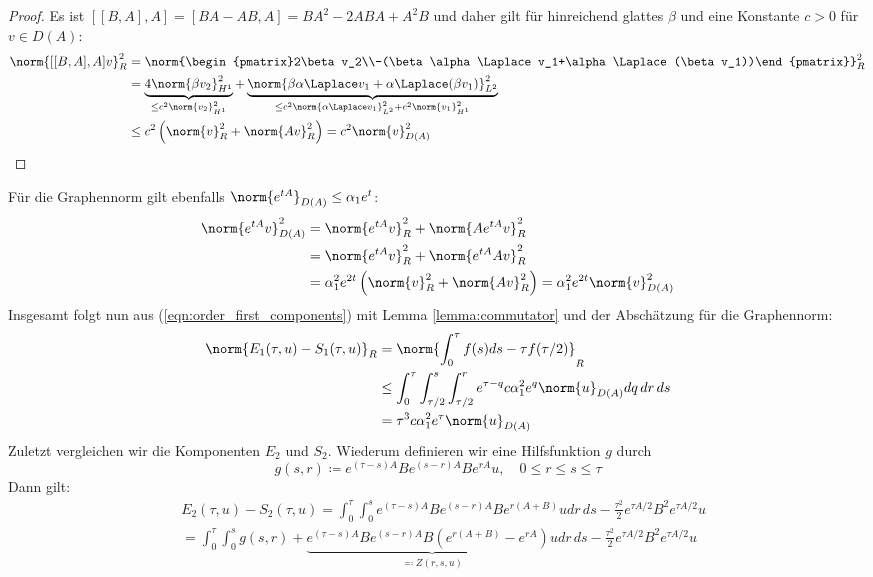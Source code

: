 \begin{proof}
Es ist $[[B,A],A]=[BA-AB,A]=BA^2-2ABA+A^2B$ und daher gilt für hinreichend glattes $\beta$ und eine Konstante $c>0$ für $v\in D(A)$:
\begin{align*}
\norm{[[B,A],A]v}_R^2&=\norm{\begin{pmatrix}2\beta v_2\\-(\beta\alpha\Laplace v_1+\alpha\Laplace(\beta v_1))\end{pmatrix}}_R^2\\
&=\underbrace{4\norm{\beta v_2}_{H^1}^2}_{\le c^2\norm{v_2}_{H^1}^2}+\underbrace{\norm{\beta\alpha\Laplace v_1 + \alpha\Laplace(\beta v_1)}_{L^2}^2}_{\le c^2\norm{\alpha \Laplace v_1}_{L^2}^2+c^2\norm{v_1}_{H^1}^2}\\
&\le c^2 \left(\norm{v}_R^2+\norm{Av}_R^2\right)=c^2\norm{v}_{D(A)}^2
\end{align*}
\end{proof}
Für die Graphennorm gilt ebenfalls $\norm{e^{tA}}_{D(A)}\le \alpha_1e^t$:
\begin{align*}
\norm{e^{tA}v}_{D(A)}^2&=\norm{e^{tA}v}_R^2+\norm{Ae^{tA}v}_R^2\\
&=\norm{e^{tA}v}_R^2+\norm{e^{tA}Av}_R^2\\
&=\alpha_1^2e^{2t}\left(\norm{v}_R^2+\norm{Av}_R^2\right)=\alpha_1^2e^{2t}\norm{v}_{D(A)}^2
\end{align*}
Insgesamt folgt nun aus (\ref{eqn:order_first_components}) mit Lemma \ref{lemma:commutator} und der Abschätzung für die Graphennorm:
\begin{align*}
\norm{E_1(\tau,u)-S_1(\tau,u)}_R&=\norm{\int_0^\tau f(s)ds-\tau f(\tau/2)}_R\\
&\le \int_0^\tau\int_{\tau/2}^s\int_{\tau/2}^r e^{\tau - q}c\alpha_1^2e^q\norm{u}_{D(A)}dq\,dr\,ds\\
&=\tau^3c\alpha_1^2e^\tau\norm{u}_{D(A)}
\end{align*}
Zuletzt vergleichen wir die Komponenten $E_2$ und $S_2$. Wiederum definieren wir eine Hilfsfunktion $g$ durch
\[g(s,r)\coloneqq e^{(\tau-s)A}Be^{(s-r)A}Be^{rA}u,\quad 0\le r\le s\le \tau\]
Dann gilt:
\begin{align*}
&E_2(\tau,u)-S_2(\tau,u)=\int_0^\tau\int_0^se^{(\tau-s)A}Be^{(s-r)A}Be^{r(A+B)}udr\,ds-\frac{\tau^2}{2}e^{\tau A/2}B^2e^{\tau A/2}u\\
&=\int_0^\tau\int_0^s g(s,r) + \underbrace{e^{(\tau-s)A}Be^{(s-r)A}B\left(e^{r(A+B)}-e^{rA}\right)u}_{\eqqcolon Z(r,s,u)}dr\,ds-\frac{\tau^2}{2}e^{\tau A/2}B^2e^{\tau A/2}u
\end{align*}
